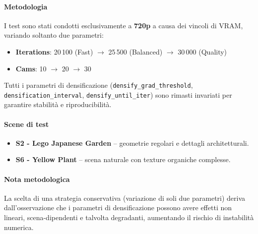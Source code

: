 \paragraph{Metodologia}
I test sono stati condotti esclusivamente a \textbf{720p} a causa dei vincoli di VRAM, 
variando soltanto due parametri:
\begin{itemize}
	\item \textbf{Iterations}: 20\,100 (Fast) $\rightarrow$ 25\,500 (Balanced) $\rightarrow$ 30\,000 (Quality)
	\item \textbf{Cams}: 10 $\rightarrow$ 20 $\rightarrow$ 30
\end{itemize}
Tutti i parametri di densificazione (\texttt{densify\_grad\_threshold}, \texttt{densification\_interval}, 
\texttt{densify\_until\_iter}) sono rimasti invariati per garantire stabilità e riproducibilità.

\paragraph{Scene di test}
\begin{itemize}
	\item \textbf{S2 - Lego Japanese Garden} -- geometrie regolari e dettagli architetturali.
	\item \textbf{S6 - Yellow Plant} -- scena naturale con texture organiche complesse.
\end{itemize}

\paragraph{Nota metodologica}
La scelta di una strategia conservativa (variazione di soli due parametri) deriva 
dall’osservazione che i parametri di densificazione possono avere effetti non lineari, 
scena-dipendenti e talvolta degradanti, aumentando il rischio di instabilità numerica.

